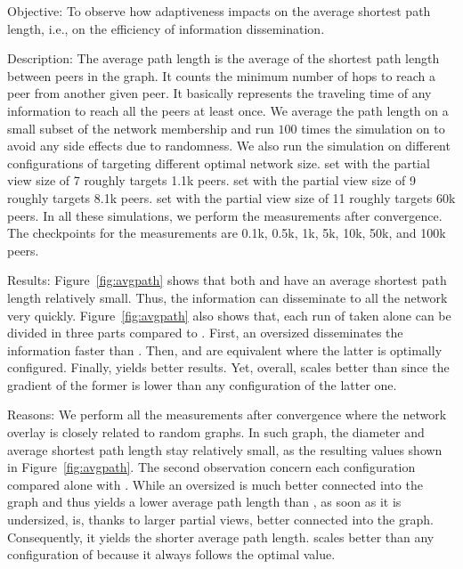 \begin{asparadesc}
\item[Objective:] To observe how adaptiveness impacts on the average shortest
  path length, i.e., on the efficiency of information dissemination.
\item[Description:] The average path length is the average of the shortest path
  length between peers in the graph. It counts the minimum number of hops to
  reach a peer from another given peer. It basically represents the traveling
  time of any information to reach all the peers at least once. We average the
  path length on a small subset of the network membership and run $100$ times
  the simulation on \SPRAY to avoid any side effects due to randomness. We also
  run the simulation on different configurations of \CYCLON targeting different
  optimal network size. \CYCLON set with the partial view size of 7 roughly
  targets 1.1k peers. \CYCLON set with the partial view size of 9 roughly
  targets 8.1k peers. \CYCLON set with the partial view size of 11 roughly
  targets 60k peers. In all these simulations, we perform the measurements
  after convergence. The checkpoints for the measurements are 0.1k, 0.5k, 1k,
  5k, 10k, 50k, and 100k peers.
\item[Results:] Figure~\ref{fig:avgpath} shows that both \CYCLON and \SPRAY
  have an average shortest path length relatively small. Thus, the information
  can disseminate to all the network very quickly. Figure~\ref{fig:avgpath}
  also shows that, each run of \CYCLON taken alone can be divided in three
  parts compared to \SPRAY. First, an oversized \CYCLON disseminates the
  information faster than \SPRAY. Then, \SPRAY and \CYCLON are equivalent
  where the latter is optimally configured. Finally, \SPRAY yields better
  results. Yet, overall, \SPRAY scales better than \CYCLON since the
  gradient of the former is lower than any configuration of the latter one.
\item[Reasons:] We perform all the measurements after convergence where the
  network overlay is closely related to random graphs. In such graph, the
  diameter and average shortest path length stay relatively small, as the
  resulting values shown in Figure~\ref{fig:avgpath}. The second observation
  concern each \CYCLON configuration compared alone with \SPRAY. While an
  oversized \CYCLON is much better connected into the graph and thus yields a
  lower average path length than \SPRAY, as soon as it is undersized, \SPRAY
  is, thanks to larger partial views, better connected into the graph.
  Consequently, it yields the shorter average path length. \SPRAY scales better
  than any configuration of \CYCLON because it always follows the optimal
  value.
\end{asparadesc}

